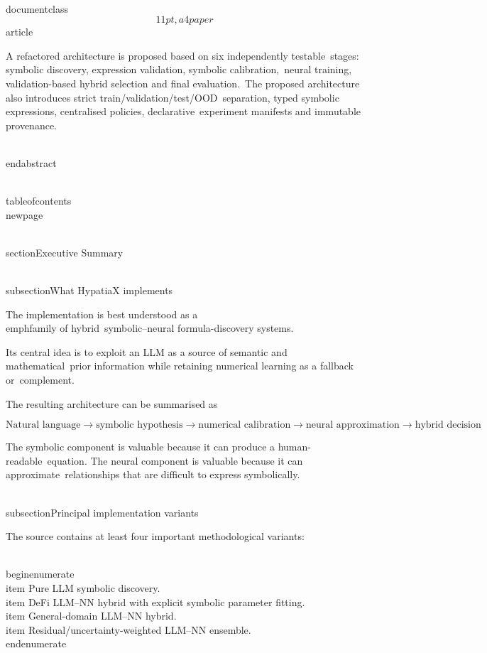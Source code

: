 \\documentclass\[11pt,a4paper\]{article}
\begin{document}
 A refactored architecture is proposed based on six independently testable\
 stages: symbolic discovery, expression validation, symbolic calibration,\
 neural training, validation-based hybrid selection and final evaluation.\
 The proposed architecture also introduces strict train/validation/test/OOD\
 separation, typed symbolic expressions, centralised policies, declarative\
 experiment manifests and immutable provenance.

 \\end{abstract}

 \\tableofcontents\
 \\newpage

 \\section{Executive Summary}\

 \\subsection{What HypatiaX implements}

 The implementation is best understood as a \\emph{family of hybrid\
 symbolic--neural formula-discovery systems}.

 Its central idea is to exploit an LLM as a source of semantic and mathematical\
 prior information while retaining numerical learning as a fallback or\
 complement.

 The resulting architecture can be summarised as

 $$
\boxed{
\text{Natural language}
\rightarrow
\text{symbolic hypothesis}
\rightarrow
\text{numerical calibration}
\rightarrow
\text{neural approximation}
\rightarrow
\text{hybrid decision}
}
$$

 The symbolic component is valuable because it can produce a human-readable\
 equation. The neural component is valuable because it can approximate\
 relationships that are difficult to express symbolically.

 \\subsection{Principal implementation variants}

 The source contains at least four important methodological variants:

 \\begin{enumerate}\
 \\item Pure LLM symbolic discovery.\
 \\item DeFi LLM--NN hybrid with explicit symbolic parameter fitting.\
 \\item General-domain LLM--NN hybrid.\
 \\item Residual/uncertainty-weighted LLM--NN ensemble.\
 \\end{enumerate}
\end{document}
